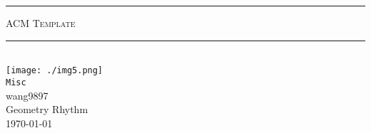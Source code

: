 

	\begin{titlepage}
		\pagestyle{plain}
		\begin{center}
			\hrule
			\vspace{0.5cm}
			\fontsize{48pt}{\baselineskip}\selectfont \textsc{ACM Template}\\
			\vspace{0.5cm}
			\hrule
			~\\
			\vspace*{0.5cm}
			\texttt{[image: ./img5.png]}\\ [1.5cm]
			\fontsize{48pt}{\baselineskip}\selectfont \texttt{Misc}\\
			\vspace{1cm}
			\huge{wang9897}\\
			\vspace{1cm}
			\huge{Geometry Rhythm}\\
			\vspace{1.5cm}
			\large{\today}
		\end{center}	
	\end{titlepage}
